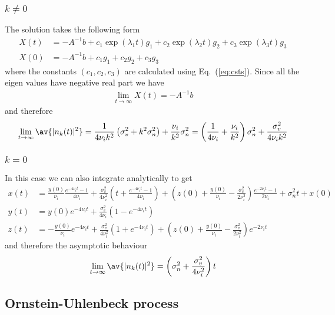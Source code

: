 \documentclass[10pt,a4paper]{article}
\newcommand{\eq}[1]{Eq.~(\ref{#1})}
\begin{document}
\subsubsection{$k\neq0$}
The solution takes the following form
\begin{align}
X(t)&=-A^{-1}b+ c_1\exp(\lambda_1t)g_1+ c_2\exp(\lambda_2t)g_2+
c_3\exp(\lambda_3t)g_3\\
X(0)&=-A^{-1}b+ c_1g_1+ c_2g_2+c_3g_3\label{eq:csts}
\end{align}
where the constants $(c_1,c_2,c_3)$ are calculated using \eq{eq:csts}.
Since all the eigen values have negative real part we have
\begin{align}
\lim_{t\rightarrow\infty} X(t) = -A^{-1} b
\end{align}
and therefore
\begin{align}
\lim_{t\rightarrow\infty} \av{|n_k(t)|^2} = 
\frac{1}{4\nu_ik^2}\left(\sigma_v^2+k^2\sigma_n^2\right)+
\frac{\nu_i}{k^2}\sigma_n^2 = 
\left(\frac{1}{4\nu_i}+\frac{\nu_i}{k^2}\right)\sigma_n^2+
\frac{\sigma_v^2}{4\nu_ik^2}
\end{align}
\subsubsection{$k=0$}
In this case we can also integrate analytically to get
\begin{align}
x(t)&=\frac{y(0)}{\nu_i}\frac{e^{-4\nu_it}{-}1}{4\nu_i}+
\frac{\sigma_v^2}{4\nu_i^2}
\left(t+\frac{e^{-4\nu_it}{-}1}{4\nu_i}\right)+
\left(z(0){+}\frac{y(0)}{\nu_i}{-}
\frac{\sigma_v^2}{2\nu_i^2}\right)\frac{e^{-2\nu_it}{-}1}{2\nu_i}
+\sigma_n^2t+x(0)\nonumber\\
y(t) &= y(0)e^{-4\nu_it}+
\frac{\sigma_v^2}{4\nu_i}\left(1{-}e^{-4\nu_it}\right)\nonumber\\
z(t) &= -\frac{y(0)}{\nu_i}e^{-4\nu_it}+
\frac{\sigma_v^2}{4\nu_i^2}\left(1+e^{-4\nu_it}\right)+
\left(z(0)+\frac{y(0)}{\nu_i}-\frac{\sigma_v^2}{2\nu_i^2}\right)e^{-2\nu_it}
\nonumber
\end{align}
and therefore the asymptotic behaviour
\begin{align}
\lim_{t\rightarrow\infty} \av{|n_k(t)|^2} =
\left(\sigma_n^2+\frac{\sigma_v^2}{4\nu_i^2}\right)t
\end{align}

\subsection{Ornstein-Uhlenbeck process}
\end{document}
